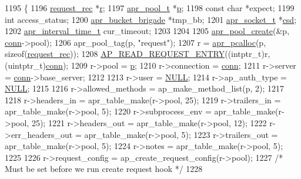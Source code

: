 \begin{DoxyCode}
1195 \{
1196     \hyperlink{structrequest__rec}{request\_rec} *\hyperlink{group__APACHE__CORE__CONFIG_ga091cdd45984e865a888a4f8bb8fe107a}{r};
1197     \hyperlink{structapr__pool__t}{apr\_pool\_t} *\hyperlink{group__APACHE__CORE__MPM_ga5cd91701e5c167f2b1a38e70ab57817e}{p};
1198     \textcolor{keyword}{const} \textcolor{keywordtype}{char} *expect;
1199     \textcolor{keywordtype}{int} access\_status;
1200     \hyperlink{structapr__bucket__brigade}{apr\_bucket\_brigade} *tmp\_bb;
1201     \hyperlink{structapr__socket__t}{apr\_socket\_t} *\hyperlink{group__APACHE__CORE__CONNECTION_ga37491385bd0907d7a64ed8a3ec309aaa}{csd};
1202     \hyperlink{group__apr__time_gaae2129185a395cc393f76fabf4f43e47}{apr\_interval\_time\_t} cur\_timeout;
1203 
1204 
1205     \hyperlink{group__apr__pools_gaa7c40921aae156b665e82b0a66991a39}{apr\_pool\_create}(&p, \hyperlink{group__MOD__PROXY_gaaf2a99e7e3709d3e41bf0a33f1004b4e}{conn}->pool);
1206     apr\_pool\_tag(p, \textcolor{stringliteral}{"request"});
1207     r = \hyperlink{group__apr__pools_gad214fc0160de3c22b6435e29ea20fce8}{apr\_pcalloc}(p, \textcolor{keyword}{sizeof}(\hyperlink{structrequest__rec}{request\_rec}));
1208     \hyperlink{apache__noprobes_8h_ae565508225e30eb021fb3b4abd9a94df}{AP\_READ\_REQUEST\_ENTRY}((intptr\_t)r, (uintptr\_t)\hyperlink{group__MOD__PROXY_gaaf2a99e7e3709d3e41bf0a33f1004b4e}{conn});
1209     r->pool            = \hyperlink{group__APACHE__CORE__MPM_ga5cd91701e5c167f2b1a38e70ab57817e}{p};
1210     r->connection      = \hyperlink{group__MOD__PROXY_gaaf2a99e7e3709d3e41bf0a33f1004b4e}{conn};
1211     r->server          = \hyperlink{group__MOD__PROXY_gaaf2a99e7e3709d3e41bf0a33f1004b4e}{conn}->base\_server;
1212 
1213     r->user            = \hyperlink{pcre_8txt_ad7f989d16aa8ca809a36bc392c07fba1}{NULL};
1214     r->ap\_auth\_type    = \hyperlink{pcre_8txt_ad7f989d16aa8ca809a36bc392c07fba1}{NULL};
1215 
1216     r->allowed\_methods = ap\_make\_method\_list(p, 2);
1217 
1218     r->headers\_in      = apr\_table\_make(r->pool, 25);
1219     r->trailers\_in     = apr\_table\_make(r->pool, 5);
1220     r->subprocess\_env  = apr\_table\_make(r->pool, 25);
1221     r->headers\_out     = apr\_table\_make(r->pool, 12);
1222     r->err\_headers\_out = apr\_table\_make(r->pool, 5);
1223     r->trailers\_out    = apr\_table\_make(r->pool, 5);
1224     r->notes           = apr\_table\_make(r->pool, 5);
1225 
1226     r->request\_config  = ap\_create\_request\_config(r->pool);
1227     \textcolor{comment}{/* Must be set before we run create request hook */}
1228 

\end{DoxyCode}
